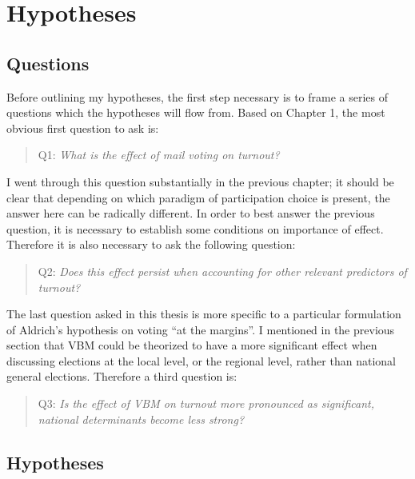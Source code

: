 \documentclass[12pt,twoside]{reedthesis}
\begin{document}
  \section{Hypotheses}\label{hypotheses}
  
  \subsection{Questions}\label{questions}
  
  Before outlining my hypotheses, the first step necessary is to frame a
  series of questions which the hypotheses will flow from. Based on
  Chapter 1, the most obvious first question to ask is:
  
  \begin{quotation}
  Q1: \textit{What is the effect of mail voting on turnout?}
  \end{quotation}
  
  I went through this question substantially in the previous chapter; it
  should be clear that depending on which paradigm of participation choice
  is present, the answer here can be radically different. In order to best
  answer the previous question, it is necessary to establish some
  conditions on importance of effect. Therefore it is also necessary to
  ask the following question:
  
  \begin{quotation}   
  Q2: \textit{Does this effect persist when accounting for other relevant predictors of turnout?}
  \end{quotation}
  
  The last question asked in this thesis is more specific to a particular
  formulation of Aldrich's hypothesis on voting ``at the margins''. I
  mentioned in the previous section that VBM could be theorized to have a
  more significant effect when discussing elections at the local level, or
  the regional level, rather than national general elections. Therefore a
  third question is:
  
  \begin{quotation}   
  Q3: \textit{Is  the  effect  of  VBM on turnout more  pronounced as significant, national determinants become less strong?}
  \end{quotation}
  
  \subsection{Hypotheses}\label{hypotheses-1}
  
\end{document}

